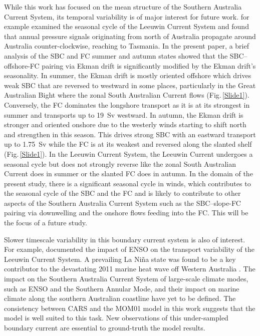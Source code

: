 \documentclass[preprint,3p,review,12pt]{elsarticle}
\begin{document}
While this work has focused on the mean structure of the Southern Australia Current System, its temporal variability is of major interest for future work. \citet{Ridgway2015} for example examined the seasonal cycle of the Leeuwin Current System and found that annual pressure signals originating from north of Australia propagate around Australia counter-clockwise, reaching to Tasmania. In the present paper, a brief analysis of the SBC and FC summer and autumn states showed that the SBC--offshore-FC pairing via Ekman drift is significantly modified by the Ekman drift's seasonality. In summer, the Ekman drift is mostly oriented offshore which drives weak SBC that are reversed to westward in some places, particularly in the Great Australian Bight where the zonal South Australian Current flows (Fig.\,\ref{Slide1}). Conversely, the FC dominates the longshore transport as it is at its strongest in summer and transports up to \SI{19}{Sv} westward. In autumn, the Ekman drift is stronger and oriented onshore due to the westerly winds starting to shift north and strengthen in this season. This drives strong SBC with an eastward transport up to \SI{1.75}{Sv} while the FC is at its weakest and reversed along the slanted shelf (Fig.\,\ref{Slide1}). In the Leeuwin Current System, the Leeuwin Current undergoes a seasonal cycle \citep{Ridgway2015} but does not strongly reverse like the zonal South Australian Current does in summer or the slanted FC does in autumn. In the domain of the present study, there is a significant seasonal cycle in winds, which contributes to the seasonal cycle of the SBC and the FC and is likely to contribute to other aspects of the Southern Australia Current System such as the SBC--slope-FC pairing via downwelling and the onshore flows feeding into the FC\@. This will be the focus of a future study. 

Slower timescale variability in this boundary current system is also of interest. For example, \citet{Feng2003} documented the impact of ENSO on the transport variability of the Leeuwin Current System. A prevailing La Ni\~na state was found to be a key contributor to the devastating 2011 marine heat wave off Western Australia \citep{Feng2013}. The impact on the Southern Australia Current System of large-scale climate modes, such as ENSO and the Southern Annular Mode, and their impact on marine climate along the southern Australian coastline have yet to be defined. The consistency between CARS and the MOM01 model in this work suggests that the model is well suited to this task. New observations of this under-sampled boundary current are essential to ground-truth the model results.
\end{document}

